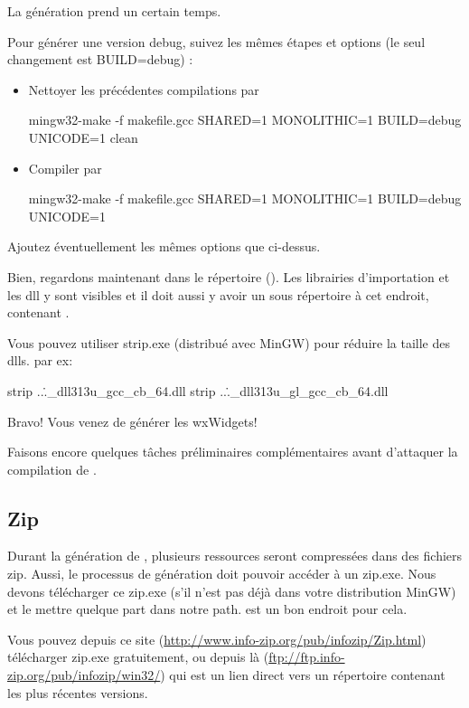La génération prend un certain temps.

Pour générer une version debug, suivez les mêmes étapes et options (le seul changement est BUILD=debug) :

\begin{itemize}
\item Nettoyer les précédentes compilations par
	\begin{cmd}
	mingw32-make -f makefile.gcc SHARED=1 MONOLITHIC=1 BUILD=debug UNICODE=1 clean
	\end{cmd}
\item Compiler par
	\begin{cmd}
	mingw32-make -f makefile.gcc SHARED=1 MONOLITHIC=1 BUILD=debug UNICODE=1
	\end{cmd}
\end{itemize}

Ajoutez éventuellement les mêmes options que ci-dessus.

Bien, regardons maintenant dans le répertoire (). Les librairies d'importation et les dll y sont visibles et il doit aussi y avoir un sous répertoire  à cet endroit, contenant .

Vous pouvez utiliser strip.exe (distribué avec MinGW) pour réduire la taille des dlls.
par ex:
\begin{cmd}
strip ..\..\lib\gcc_dll\wxmsw313u_gcc_cb_64.dll
strip ..\..\lib\gcc_dll\wxmsw313u_gl_gcc_cb_64.dll
\end{cmd}

Bravo! Vous venez de générer les wxWidgets!

Faisons encore quelques tâches préliminaires complémentaires avant d'attaquer la compilation de \codeblocks.

\subsection{Zip}

Durant la génération de \codeblocks, plusieurs ressources seront compressées dans des fichiers zip. Aussi, le processus de génération doit pouvoir accéder à un zip.exe. Nous devons télécharger ce zip.exe (s'il n'est pas déjà dans votre distribution MinGW) et le mettre quelque part dans notre path.  est un bon endroit pour cela.

Vous pouvez depuis ce site (\url{http://www.info-zip.org/pub/infozip/Zip.html}) télécharger zip.exe gratuitement, ou depuis là (\url{ftp://ftp.info-zip.org/pub/infozip/win32/}) qui est un lien direct vers un répertoire contenant les plus récentes versions.

